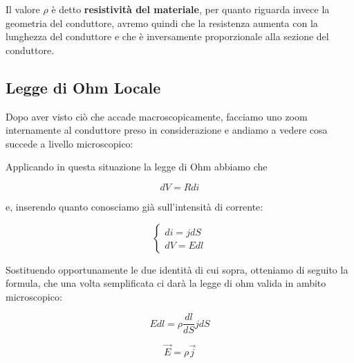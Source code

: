 Il  valore $\rho$ è detto \textbf{resistività del materiale}, per quanto riguarda invece la geometria del conduttore, avremo quindi che la resistenza aumenta con la lunghezza del conduttore e che è inversamente proporzionale alla sezione del conduttore. 

\subsection{Legge di Ohm Locale}

Dopo aver visto ciò che accade macroscopicamente, facciamo uno zoom internamente al conduttore preso in considerazione e andiamo a vedere cosa succede a livello microscopico: 

\begin{figure} [ht]
	\centering
\end{figure}

Applicando in questa situazione la legge di Ohm abbiamo che

$$
dV = Rdi
$$ 

e, inserendo quanto conosciamo già sull'intensità di corrente: 

$$
\begin{cases}
	di = jdS \\
	dV = Edl
\end{cases}
$$

Sostituendo opportunamente le due identità di cui sopra, otteniamo di seguito la formula, che una volta semplificata ci darà la legge di ohm valida in ambito microscopico: 

\begin{large} 
\begin{equation}
	Edl = \rho \frac{dl}{dS} j dS 
\end{equation}
\end{large}

\begin{tcolorbox}[colframe=red, colback=red!10, title=Legge di Ohm Locale]
	\begin{large}
		\begin{equation}
				\vec{E} = \rho \vec{j}
		\end{equation}
	\end{large}
\end{tcolorbox}

